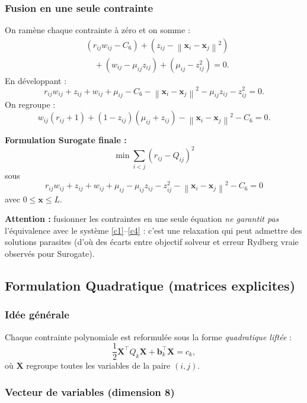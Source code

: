 \documentclass[12pt,a4paper]{article}
\newcommand{\norm}[1]{\left\|#1\right\|}
\begin{document}
\subsubsection{Fusion en une seule contrainte}

On ramène chaque contrainte à zéro et on somme :
\begin{align*}
  &(r_{ij}w_{ij}-C_6) + (z_{ij}-\norm{\mathbf{x}_i-\mathbf{x}_j}^2) \\
  &\quad + (w_{ij}-\mu_{ij}z_{ij}) + (\mu_{ij}-z_{ij}^2) = 0.
\end{align*}
En développant :
\[
  r_{ij}w_{ij} + z_{ij} + w_{ij} + \mu_{ij}
  - C_6 - \norm{\mathbf{x}_i-\mathbf{x}_j}^2 - \mu_{ij}z_{ij} - z_{ij}^2 = 0.
\]
On regroupe :
\[
  w_{ij}(r_{ij}+1) + (1-z_{ij})(\mu_{ij}+z_{ij})
  - \norm{\mathbf{x}_i-\mathbf{x}_j}^2 - C_6 = 0.
\]

\begin{objetifbox}
\textbf{Formulation Surogate finale :}
\[
  \min \sum_{i<j}(r_{ij}-Q_{ij})^2
\]
sous
\[
  \boxed{
  r_{ij}w_{ij} + z_{ij} + w_{ij} + \mu_{ij}
  - \mu_{ij}z_{ij} - z_{ij}^2
  - \norm{\mathbf{x}_i-\mathbf{x}_j}^2 - C_6 = 0
  }
\]
avec $0 \leq \mathbf{x} \leq L$.
\end{objetifbox}

\textbf{Attention :} fusionner les contraintes en une seule équation
\emph{ne garantit pas} l'équivalence avec le système
\eqref{c1}--\eqref{c4} : c'est une relaxation qui peut admettre
des solutions parasites (d'où des écarts entre objectif solveur
et erreur Rydberg vraie observés pour Surogate).

\subsection{Formulation Quadratique (matrices explicites)}

\subsubsection{Idée générale}

Chaque contrainte polynomiale est reformulée sous la forme
\emph{quadratique liftée} :
\[
  \frac{1}{2}\mathbf{X}^\top Q_k \mathbf{X} + \mathbf{b}_k^\top \mathbf{X} = c_k,
\]
où $\mathbf{X}$ regroupe toutes les variables de la paire $(i,j)$.

\subsubsection{Vecteur de variables (dimension 8)}
\end{document}
